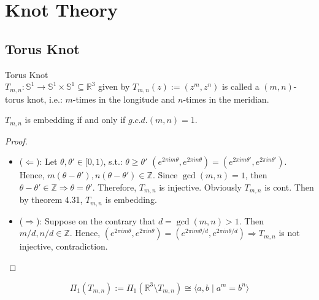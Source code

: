 \chapter{Knot Theory}

\section{Torus Knot}

\begin{definition}{Torus Knot}\\
$T_{m,n} : \mathbb{S}^1 \to \mathbb{S}^1 \times \mathbb{S}^1 \subseteq \mathbb{R}^3$ given by $T_{m,n} (z) := (z^m,z^n)$ is called a $(m,n)$-torus knot, i.e.: $m$-times in the longitude and $n$-times in the meridian.
\end{definition}

\begin{proposition}
    $T_{m,n}$ is embedding if and only if $g.c.d.(m,n) =1$.
\end{proposition}

\begin{proof}
    \begin{itemize}
        \item ($\Leftarrow$): Let $\theta ,\theta' \in [0,1)$, s.t.: $\theta \geq \theta'$ $(e^{2\pi i m\theta}, e^{2\pi i n\theta}) = (e^{2\pi i m\theta'}, e^{2\pi i n\theta'})$. Hence, $m(\theta - \theta'), n(\theta - \theta') \in \mathbb{Z}$. Since $\gcd(m,n) =1$, then $\theta - \theta ' \in \mathbb{Z} \Rightarrow \theta = \theta'$. Therefore, $T_{m,n}$ is injective. Obviously $T_{m,n}$ is cont. Then by theorem 4.31, $T_{m,n}$ is embedding.

        \item ($\Rightarrow$): Suppose on the contrary that $d = \gcd (m,n) >1$. Then $m/d,n/d \in \mathbb{Z}$. Hence, $(e^{2 \pi im\theta}, e^{2 \pi in\theta}) = (e^{2 \pi im\theta /d}, e^{2 \pi in\theta/d}) \Rightarrow T_{m,n}$ is not injective, contradiction.
    \end{itemize}
\end{proof}

\begin{theorem}
    $$\Pi_1(T_{m,n}) := \Pi_1(\mathbb{R}^3 \setminus T_{m,n}) \cong \langle a,b \mid a^m =b^n \rangle$$
\end{theorem}

